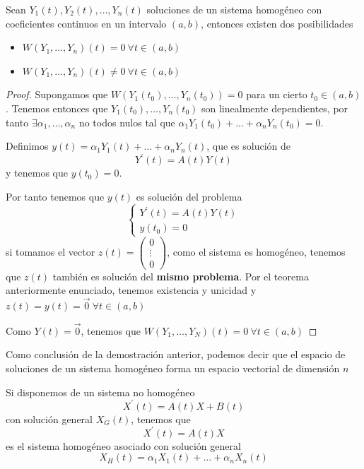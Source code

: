 \documentclass{mathnotes}
\begin{document}
\begin{theorem}
Sean $Y_1(t), Y_2(t), \hdots, Y_n(t)$ soluciones de un sistema homogéneo con coeficientes continuos en un intervalo $(a,b)$, entonces existen dos posibilidades
\begin{itemize}
\item $W(Y_1, \hdots, Y_n)(t) = 0\ \forall t \in (a, b)$
\item $W(Y_1, \hdots, Y_n)(t) \neq 0\ \forall t \in (a, b)$
\end{itemize}
\end{theorem}

\begin{proof}
Supongamos que $W(Y_1(t_0), \hdots, Y_n(t_0)) = 0$ para un cierto $t_0 \in (a,b)$. Tenemos entonces que $Y_1(t_0), \hdots, Y_n(t_0)$ son linealmente dependientes, por tanto $\exists \alpha_1,\hdots,\alpha_n$ no todos nulos tal que $\alpha_1Y_1(t_0)+\hdots+\alpha_nY_n(t_0) = 0$.

Definimos $y(t) = \alpha_1Y_1(t)+\hdots+\alpha_nY_n(t)$, que es solución de $$Y^\prime(t) = A(t)Y(t)$$ y tenemos que $y(t_0) = 0$.

Por tanto tenemos que $y(t)$ es solución del problema
\begin{equation*}
  \left\lbrace
  \begin{array}{l}
     Y^\prime(t) = A(t)Y(t)\\
     y(t_0) = 0
  \end{array}
  \right.
\end{equation*}
si tomamos el vector $z(t) = \begin{pmatrix}
0\\\vdots\\0
\end{pmatrix}$, como el sistema es homogéneo, tenemos que $z(t)$ también es solución del \textbf{mismo problema}. Por el teorema anteriormente enunciado, tenemos existencia y unicidad y $z(t) = y(t) = \vec{0}\ \forall t \in (a,b)$

Como $Y(t) = \vec{0}$, tenemos que $W(Y_1,\hdots,Y_N)(t) = 0\ \forall t\in (a,b)$
\end{proof}

Como conclusión de la demostración anterior, podemos decir que el espacio de soluciones de un sistema homogéneo forma un espacio vectorial de dimensión $n$

\vspace{5mm}
\obs

Si disponemos de un sistema no homogéneo $$X^\prime(t) = A(t)X+B(t)$$
con solución general $X_G(t)$, tenemos que $$X^\prime(t) = A(t)X$$ es el sistema homogéneo asociado con solución general $$X_H(t) = \alpha_1X_1(t)+\hdots+\alpha_nX_n(t)$$
\end{document}
